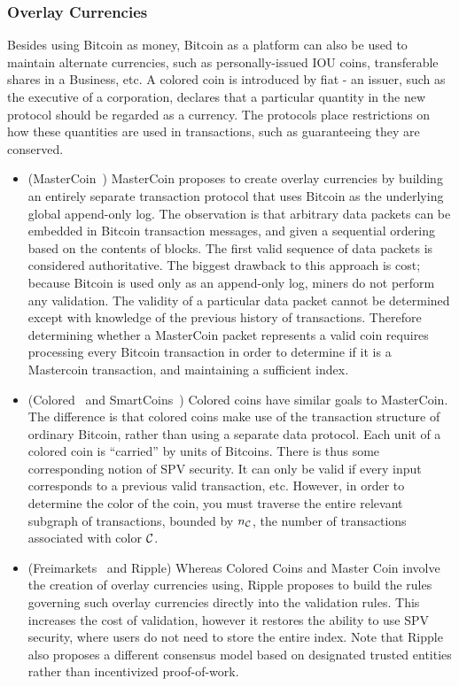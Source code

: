 \subsubsection{Overlay Currencies}
Besides using Bitcoin as money, Bitcoin as a platform can also be used to maintain alternate currencies, such as personally-issued IOU coins, transferable shares in a Business, etc. A colored coin is introduced by fiat - an issuer, such as the executive of a corporation, declares that a particular quantity in the new protocol should be regarded as a currency. The protocols place restrictions on how these quantities are used in transactions, such as guaranteeing they are conserved.

\begin{itemize}
\item (MasterCoin~\cite{mastercoin}) MasterCoin proposes to create overlay currencies by building an entirely separate transaction protocol that uses Bitcoin as the underlying global append-only log. The observation is that arbitrary data packets can be embedded in Bitcoin transaction messages, and given a sequential ordering based on the contents of blocks. The first valid sequence of data packets is considered authoritative. The biggest drawback to this approach is cost; because Bitcoin is used only as an append-only log, miners do not perform any validation. The validity of a particular data packet cannot be determined except with knowledge of the previous history of transactions. Therefore determining whether a MasterCoin packet represents a valid coin requires processing every Bitcoin transaction in order to determine if it is a Mastercoin transaction, and maintaining a sufficient index.

\item (Colored~\cite{coloredcoins,bitcointalk-coloredcoins} and SmartCoins~\cite{jgarzik-smartcoin}) Colored coins have similar goals to MasterCoin. The difference is that colored coins make use of the transaction structure of ordinary Bitcoin, rather than using a separate data protocol. Each unit of a colored coin is ``carried'' by units of Bitcoins. There is thus some corresponding notion of SPV security. It can only be valid if every input corresponds to a previous valid transaction, etc. However, in order to determine the color of the coin, you must traverse the entire relevant subgraph of transactions, bounded by $n_{\cal C}$, the number of transactions associated with color ${\cal C}$.

\item (Freimarkets~\cite{freimarkets} and Ripple) Whereas Colored Coins and Master Coin involve the creation of overlay currencies using, Ripple proposes to build the rules governing such overlay currencies directly into the validation rules. This increases the cost of validation, however it restores the ability to use SPV security, where users do not need to store the entire index. Note that Ripple also proposes a different consensus model based on designated trusted entities rather than incentivized proof-of-work.


\end{itemize}
